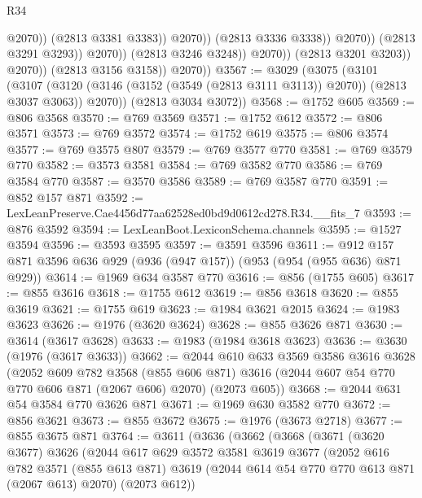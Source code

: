 \begin{lexlean}{R34}
\begin{coremodule}
                                            @2070))
                                        (@2813 @3381 @3383))
                                      @2070))
                                  (@2813 @3336 @3338))
                                @2070))
                            (@2813 @3291 @3293))
                          @2070))
                      (@2813 @3246 @3248))
                    @2070))
                (@2813 @3201 @3203))
              @2070))
          (@2813 @3156 @3158))
        @2070))
@3567 := @3029
    (@3075
      (@3101
        (@3107 (@3120 (@3146 (@3152 (@3549 (@2813 @3111 @3113)) @2070)) (@2813 @3037 @3063)) @2070))
      (@2813 @3034 @3072))
@3568 := @1752 @605
@3569 := @806 @3568
@3570 := @769 @3569
@3571 := @1752 @612
@3572 := @806 @3571
@3573 := @769 @3572
@3574 := @1752 @619
@3575 := @806 @3574
@3577 := @769 @3575 @807
@3579 := @769 @3577 @770
@3581 := @769 @3579 @770
@3582 := @3573 @3581
@3584 := @769 @3582 @770
@3586 := @769 @3584 @770
@3587 := @3570 @3586
@3589 := @769 @3587 @770
@3591 := @852 @157 @871
@3592 := LexLeanPreserve.Cae4456d77aa62528ed0bd9d0612cd278.R34.__fits_7
@3593 := @876 @3592
@3594 := LexLeanBoot.LexiconSchema.channels
@3595 := @1527 @3594
@3596 := @3593 @3595
@3597 := @3591 @3596
@3611 := @912 @157 @871 @3596 @636 @929 (@936 (@947 @157)) (@953 (@954 (@955 @636) @871 @929))
@3614 := @1969 @634 @3587 @770
@3616 := @856 (@1755 @605)
@3617 := @855 @3616
@3618 := @1755 @612
@3619 := @856 @3618
@3620 := @855 @3619
@3621 := @1755 @619
@3623 := @1984 @3621 @2015
@3624 := @1983 @3623
@3626 := @1976 (@3620 @3624)
@3628 := @855 @3626 @871
@3630 := @3614 (@3617 @3628)
@3633 := @1983 (@1984 @3618 @3623)
@3636 := @3630 (@1976 (@3617 @3633))
@3662 := @2044
    @610
    @633
    @3569
    @3586
    @3616
    @3628
    (@2052
      @609
      @782
      @3568
      (@855 @606 @871)
      @3616
      (@2044 @607 @54 @770 @770 @606 @871 (@2067 @606) @2070)
      (@2073 @605))
@3668 := @2044 @631 @54 @3584 @770 @3626 @871
@3671 := @1969 @630 @3582 @770
@3672 := @856 @3621
@3673 := @855 @3672
@3675 := @1976 (@3673 @2718)
@3677 := @855 @3675 @871
@3764 := @3611
    (@3636
      (@3662
        (@3668
          (@3671
            (@3620 @3677)
            @3626
            (@2044
              @617
              @629
              @3572
              @3581
              @3619
              @3677
              (@2052
                @616
                @782
                @3571
                (@855 @613 @871)
                @3619
                (@2044 @614 @54 @770 @770 @613 @871 (@2067 @613) @2070)
                (@2073 @612))

\end{coremodule}
\end{lexlean}
